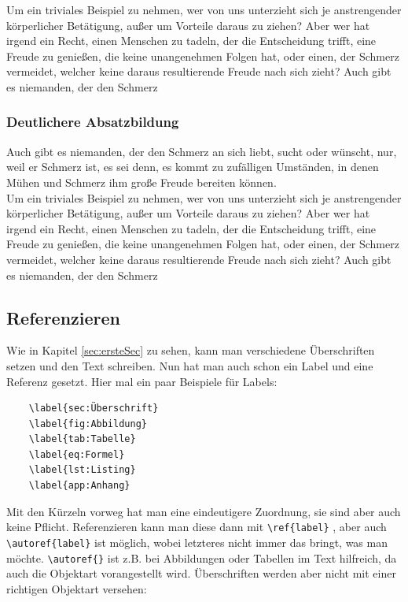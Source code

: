 Um ein triviales Beispiel zu nehmen, wer von uns unterzieht sich je anstrengender körperlicher Betätigung, außer um Vorteile daraus zu ziehen? Aber wer hat irgend ein Recht, einen Menschen zu tadeln, der die Entscheidung trifft, eine Freude zu genießen, die keine unangenehmen Folgen hat, oder einen, der Schmerz vermeidet, welcher keine daraus resultierende Freude nach sich zieht? Auch gibt es niemanden, der den Schmerz


\subsubsection{Deutlichere Absatzbildung} \label{sec:deutlicher-absatz}

Auch gibt es niemanden, der den Schmerz an sich liebt, sucht oder wünscht, nur, weil er Schmerz ist, es sei denn, es kommt zu zufälligen Umständen, in denen Mühen und Schmerz ihm große Freude bereiten können.\\ %

Um ein triviales Beispiel zu nehmen, wer von uns unterzieht sich je anstrengender körperlicher Betätigung, außer um Vorteile daraus zu ziehen? Aber wer hat irgend ein Recht, einen Menschen zu tadeln, der die Entscheidung trifft, eine Freude zu genießen, die keine unangenehmen Folgen hat, oder einen, der Schmerz vermeidet, welcher keine daraus resultierende Freude nach sich zieht? Auch gibt es niemanden, der den Schmerz


\subsection{Referenzieren}

Wie in Kapitel \ref{sec:ersteSec} zu sehen, kann man verschiedene Überschriften setzen und den Text schreiben. Nun hat man auch schon ein Label und eine Referenz gesetzt. Hier mal ein paar Beispiele für Labels:

\begin{verbatim}
    \label{sec:Überschrift}
    \label{fig:Abbildung}
    \label{tab:Tabelle}
    \label{eq:Formel}
    \label{lst:Listing}
    \label{app:Anhang}
\end{verbatim}

Mit den Kürzeln vorweg hat man eine eindeutigere Zuordnung, sie sind aber auch keine Pflicht. Referenzieren kann man diese dann mit \verb|\ref{label}| , aber auch \verb|\autoref{label}| ist möglich, wobei letzteres nicht immer das bringt, was man möchte. \verb|\autoref{}| ist z.B. bei Abbildungen oder Tabellen im Text hilfreich, da auch die Objektart vorangestellt wird. Überschriften werden aber nicht mit einer richtigen Objektart versehen:

